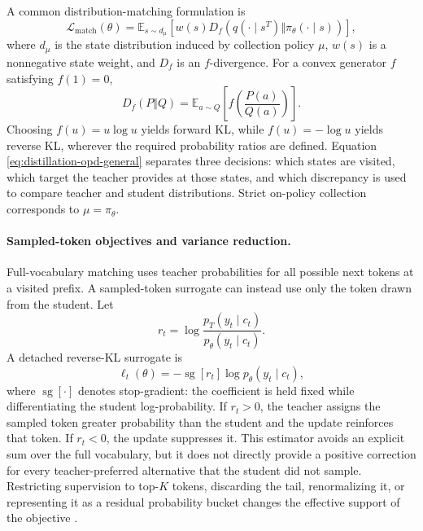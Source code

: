 A common distribution-matching formulation is
\begin{equation}
    \mathcal L_{\mathrm{match}}(\theta)
    =\mathbb E_{s\sim d_\mu}
    \left[
      w(s)D_f\left(
      q(\cdot\mid s^T)\Vert
      \pi_\theta(\cdot\mid s)
      \right)
    \right],
    \label{eq:distillation-opd-general}
\end{equation}
where \(d_\mu\) is the state distribution induced by collection policy
\(\mu\), \(w(s)\) is a nonnegative state weight, and \(D_f\) is an
\(f\)-divergence.  For a convex generator \(f\) satisfying \(f(1)=0\),
\begin{equation}
    D_f(P\Vert Q)
    =\mathbb E_{a\sim Q}
    \left[
      f\left(\frac{P(a)}{Q(a)}\right)
    \right].
    \label{eq:distillation-f-divergence}
\end{equation}
Choosing \(f(u)=u\log u\) yields forward KL, while
\(f(u)=-\log u\) yields reverse KL, wherever the required probability
ratios are defined.  Equation \cref{eq:distillation-opd-general}
separates three decisions: which states are visited, which target the teacher
provides at those states, and which discrepancy is used to compare teacher
and student distributions.  Strict on-policy collection corresponds to
\(\mu=\pi_\theta\).

\paragraph{Sampled-token objectives and variance reduction.}
Full-vocabulary matching uses teacher probabilities for all possible next
tokens at a visited prefix.  A sampled-token surrogate can instead use only
the token drawn from the student.  Let
\begin{equation}
    r_t=\log\frac{p_T(y_t\mid c_t)}
    {p_\theta(y_t\mid c_t)}.
    \label{eq:distillation-opd-log-ratio}
\end{equation}
A detached reverse-KL surrogate is
\begin{equation}
    \ell_t(\theta)
    =-\operatorname{sg}[r_t]
    \log p_\theta(y_t\mid c_t),
    \label{eq:distillation-opd-sampled-surrogate}
\end{equation}
where \(\operatorname{sg}[\cdot]\) denotes stop-gradient: the
coefficient is held fixed while differentiating the student log-probability.
If \(r_t>0\), the teacher assigns the sampled token greater probability
than the student and the update reinforces that token.  If \(r_t<0\), the
update suppresses it.  This estimator avoids an explicit sum over the full
vocabulary, but it does not directly provide a positive correction for every
teacher-preferred alternative that the student did not sample.  Restricting
supervision to top-\(K\) tokens, discarding the tail, renormalizing it, or
representing it as a residual probability bucket changes the effective
support of the objective \parencite{Song2026OnPolicyDistillation}.

